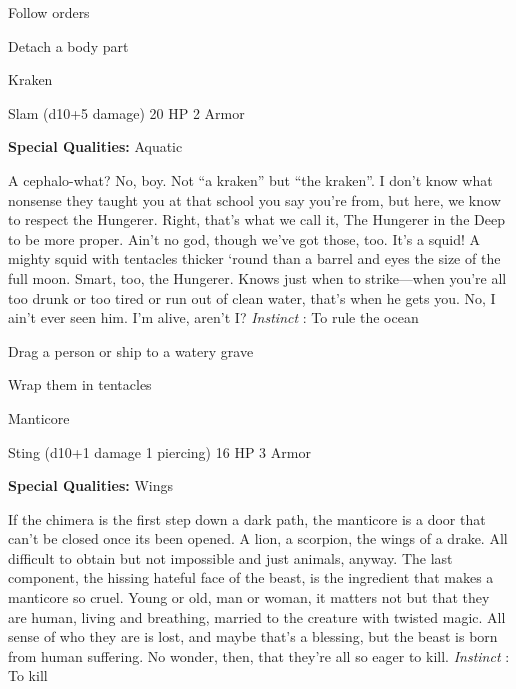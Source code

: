 \startitemize[1,packed]
         
\item Follow orders

         
\item Detach a body part

       
\stopitemize
       
\startMonsterName
Kraken	 
\stopMonsterName
       

Slam (d10+5 damage)	20 HP	2 Armor

       


       
\startMonsterQualities
         {\bf Special Qualities:}  Aquatic
\stopMonsterQualities
       
\startMonsterDescription
A cephalo-what? No, boy. Not “a kraken” but “the kraken”. I don’t know what nonsense they taught you at that school you say you’re from, but here, we know to respect the Hungerer. Right, that’s what we call it, The Hungerer in the Deep to be more proper. Ain’t no god, though we’ve got those, too. It’s a squid! A mighty squid with tentacles thicker ‘round than a barrel and eyes the size of the full moon. Smart, too, the Hungerer. Knows just when to strike—when you’re all too drunk or too tired or run out of clean water, that’s when he gets you. No, I ain’t ever seen him. I’m alive, aren’t I? {\em Instinct} : To rule the ocean
\stopMonsterDescription
       
\startitemize[1,packed]
         
\item Drag a person or ship to a watery grave

         
\item Wrap them in tentacles

       
\stopitemize
       
\startMonsterName
Manticore	 
\stopMonsterName
       

Sting (d10+1 damage 1 piercing)	16 HP	3 Armor

       


       
\startMonsterQualities
         {\bf Special Qualities:}  Wings
\stopMonsterQualities
       
\startMonsterDescription
If the chimera is the first step down a dark path, the manticore is a door that can’t be closed once its been opened. A lion, a scorpion, the wings of a drake. All difficult to obtain but not impossible and just animals, anyway. The last component, the hissing hateful face of the beast, is the ingredient that makes a manticore so cruel. Young or old, man or woman, it matters not but that they are human, living and breathing, married to the creature with twisted magic. All sense of who they are is lost, and maybe that’s a blessing, but the beast is born from human suffering. No wonder, then, that they’re all so eager to kill. {\em Instinct} : To kill
\stopMonsterDescription
       
